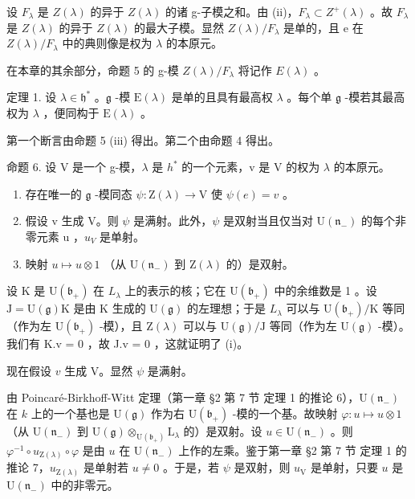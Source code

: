设 \(F_{\lambda}\) 是 \(Z(\lambda)\) 的异于 \(Z(\lambda)\) 的诸 g-子模之和。由 (ii)，\(F_{\lambda} \subset Z^{+}(\lambda)\) 。故 \(F_{\lambda}\) 是 \(Z(\lambda)\) 的异于 \(Z(\lambda)\) 的最大子模。显然 \(Z(\lambda)/F_{\lambda}\) 是单的，且 e 在 \(Z(\lambda)/F_{\lambda}\) 中的典则像是权为 \(\lambda\) 的本原元。

在本章的其余部分，命题 5 的 g-模 \(Z(\lambda)/F_{\lambda}\) 将记作 \(E(\lambda)\) 。

定理 1. 设 \(\lambda \in \mathfrak{h}^*\) 。\(\mathfrak{g}\) -模 \(\mathrm{E}(\lambda)\) 是单的且具有最高权 \(\lambda\) 。每个单 \(\mathfrak{g}\) -模若其最高权为 \(\lambda\) ，便同构于 \(\mathrm{E}(\lambda)\) 。

第一个断言由命题 5 (iii) 得出。第二个由命题 4 得出。

命题 6. 设 V 是一个 g-模，\(\lambda\) 是 \(h^{*}\) 的一个元素，v 是 V 的权为 \(\lambda\) 的本原元。

\begin{enumerate}
\def\labelenumi{(\roman{enumi})}
\item
  存在唯一的 \(\mathfrak{g}\) -模同态 \(\psi: \mathrm{Z}(\lambda) \to \mathrm{V}\) 使 \(\psi(e) = v\) 。
\item
  假设 v 生成 V。则 \(\psi\) 是满射。此外，\(\psi\) 是双射当且仅当对 \(\mathrm{U}(\mathfrak{n}_{-})\) 的每个非零元素 u ，\(u_{V}\) 是单射。
\item
  映射 \(u \mapsto u \otimes 1\) （从 \(\mathrm{U}(\mathfrak{n}_{-})\) 到 \(\mathrm{Z}(\lambda)\) 的）是双射。
\end{enumerate}

设 K 是 \(\mathrm{U}(\mathfrak{b}_{+})\) 在 \(L_{\lambda}\) 上的表示的核；它在 \(\mathrm{U}(\mathfrak{b}_{+})\) 中的余维数是 1 。设 \(\mathrm{J} = \mathrm{U}(\mathfrak{g})\mathrm{K}\) 是由 K 生成的 \(\mathrm{U}(\mathfrak{g})\) 的左理想；于是 \(L_{\lambda}\) 可以与 \(\mathrm{U}(\mathfrak{b}_{+})/\mathrm{K}\) 等同（作为左 \(\mathrm{U}(\mathfrak{b}_{+})\) -模），且 \(\mathrm{Z}(\lambda)\) 可以与 \(\mathrm{U}(\mathfrak{g})/\mathrm{J}\) 等同（作为左 \(\mathrm{U}(\mathfrak{g})\) -模）。我们有 K.v = 0 ，故 J.v = 0 ，这就证明了 (i)。

现在假设 \(v\) 生成 V。显然 \(\psi\) 是满射。

由 Poincaré-Birkhoff-Witt 定理（第一章 §2 第 7 节 定理 1 的推论 6），\(\mathrm{U}(\mathfrak{n}_{-})\) 在 \(k\) 上的一个基也是 \(\mathrm{U}(\mathfrak{g})\) 作为右 \(\mathrm{U}(\mathfrak{b}_{+})\) -模的一个基。故映射 \(\varphi : u \mapsto u \otimes 1\) （从 \(\mathrm{U}(\mathfrak{n}_{-})\) 到 \(\mathrm{U}(\mathfrak{g}) \otimes_{\mathrm{U}(\mathfrak{b}_{+})} \mathrm{L}_{\lambda}\) 的）是双射。设 \(u \in \mathrm{U}(\mathfrak{n}_{-})\) 。则 \(\varphi^{-1} \circ u_{\mathrm{Z}(\lambda)} \circ \varphi\) 是由 \(u\) 在 \(\mathrm{U}(\mathfrak{n}_{-})\) 上作的左乘。鉴于第一章 §2 第 7 节 定理 1 的推论 7，\(u_{\mathrm{Z}(\lambda)}\) 是单射若 \(u \neq 0\) 。于是，若 \(\psi\) 是双射，则 \(u_{\mathrm{V}}\) 是单射，只要 \(u\) 是 \(\mathrm{U}(\mathfrak{n}_{-})\) 中的非零元。

